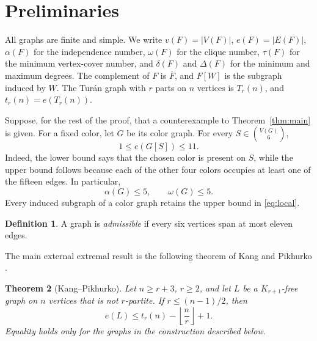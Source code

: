 \documentclass[11pt,reqno,a4paper]{amsart}
\newtheorem{theorem}{Theorem}[section]
\theoremstyle{definition}
\newtheorem{definition}[theorem]{Definition}
\theoremstyle{remark}
\newcommand{\comp}[1]{\overline{#1}}
\begin{document}
\section{Preliminaries}

All graphs are finite and simple.  We write $v(F)=|V(F)|$, $e(F)=|E(F)|$,
$\alpha(F)$ for the independence number, $\omega(F)$ for the clique number,
$\tau(F)$ for the minimum vertex-cover number, and $\delta(F)$ and
$\Delta(F)$ for the minimum and maximum degrees.  The
complement of $F$ is $\comp F$, and $F[W]$ is the subgraph induced by $W$.
The Tur\'an graph with $r$ parts on $n$ vertices is $T_r(n)$, and
$t_r(n)=e(T_r(n))$.

Suppose, for the rest of the proof, that a counterexample to
Theorem~\ref{thm:main} is given.  For a fixed color, let $G$ be its color
graph.  For every $S\in\binom{V(G)}6$,
\begin{equation}\label{eq:local}
  1\leq e(G[S])\leq11.
\end{equation}
Indeed, the lower bound says that the chosen color is present on $S$, while
the upper bound follows because each of the other four colors occupies at
least one of the fifteen edges.  In particular,
\begin{equation}\label{eq:alpha-omega}
  \alpha(G)\leq5,
  \qquad
  \omega(G)\leq5.
\end{equation}
Every induced subgraph of a color graph retains the upper bound in
\eqref{eq:local}.

\begin{definition}
A graph is \emph{admissible} if every six vertices span at most eleven edges.
\end{definition}

The main external extremal result is the following theorem of Kang and
Pikhurko \cite[Theorems 1 and 4, Lemma 5]{KangPikhurko2005}.

\begin{theorem}[Kang--Pikhurko]\label{thm:KP}
Let $n\geq r+3$, $r\geq2$, and let $L$ be a $K_{r+1}$-free graph on $n$
vertices that is not $r$-partite.  If $r\leq(n-1)/2$, then
\begin{equation}\label{eq:KP}
  e(L)\leq t_r(n)-\left\lfloor\frac nr\right\rfloor+1.
\end{equation}
Equality holds only for the graphs in the construction described
below.
\end{theorem}
\end{document}

